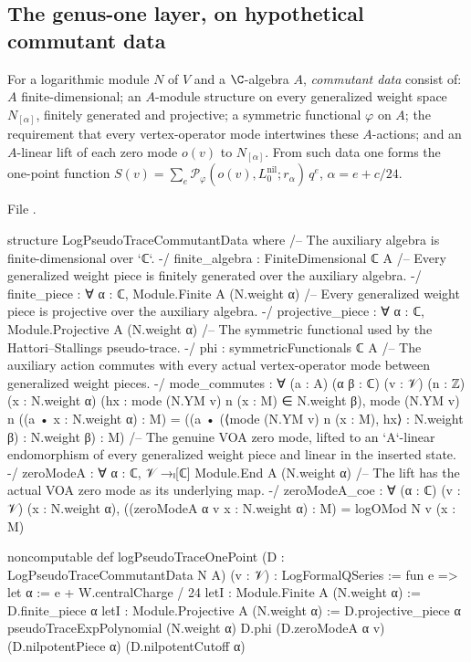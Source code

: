 \subsection{The genus-one layer, on hypothetical commutant data}

\begin{definition}\label{l18:def:commutant}
For a logarithmic module $N$ of $V$ and a $\C$-algebra $A$, \emph{commutant data} consist of: $A$
finite-dimensional; an $A$-module structure on every generalized weight space $N_{[\alpha]}$, finitely generated and
projective; a symmetric functional $\varphi$ on $A$; the requirement that every vertex-operator mode intertwines these
$A$-actions; and an $A$-linear lift of each zero mode $o(v)$ to $N_{[\alpha]}$. From such data one forms the
one-point function $S(v)=\sum_e\mathcal P_\varphi(o(v),L_0^{\mathrm{nil}};r_\alpha)\,q^e$, $\alpha=e+c/24$.
\end{definition}
\noindent File .
\begin{leancode}
structure LogPseudoTraceCommutantData where
  /-- The auxiliary algebra is finite-dimensional over `ℂ`. -/
  finite_algebra : FiniteDimensional ℂ A
  /-- Every generalized weight piece is finitely generated over the auxiliary algebra. -/
  finite_piece : ∀ α : ℂ, Module.Finite A (N.weight α)
  /-- Every generalized weight piece is projective over the auxiliary algebra. -/
  projective_piece : ∀ α : ℂ, Module.Projective A (N.weight α)
  /-- The symmetric functional used by the Hattori--Stallings pseudo-trace. -/
  phi : symmetricFunctionals ℂ A
  /-- The auxiliary action commutes with every actual vertex-operator mode between generalized
  weight pieces. -/
  mode_commutes : ∀ (a : A) (α β : ℂ) (v : 𝒱) (n : ℤ) (x : N.weight α)
    (hx : mode (N.YM v) n (x : M) ∈ N.weight β),
    mode (N.YM v) n ((a • x : N.weight α) : M) =
      ((a • (⟨mode (N.YM v) n (x : M), hx⟩ : N.weight β) : N.weight β) : M)
  /-- The genuine VOA zero mode, lifted to an `A`-linear endomorphism of every generalized
  weight piece and linear in the inserted state. -/
  zeroModeA : ∀ α : ℂ, 𝒱 →ₗ[ℂ] Module.End A (N.weight α)
  /-- The lift has the actual VOA zero mode as its underlying map. -/
  zeroModeA_coe : ∀ (α : ℂ) (v : 𝒱) (x : N.weight α),
    ((zeroModeA α v x : N.weight α) : M) = logOMod N v (x : M)
\end{leancode}
\begin{leancode}
noncomputable def logPseudoTraceOnePoint (D : LogPseudoTraceCommutantData N A) (v : 𝒱) :
    LogFormalQSeries :=
  fun e =>
    let α := e + W.centralCharge / 24
    letI : Module.Finite A (N.weight α) := D.finite_piece α
    letI : Module.Projective A (N.weight α) := D.projective_piece α
    pseudoTraceExpPolynomial (N.weight α) D.phi (D.zeroModeA α v)
      (D.nilpotentPiece α) (D.nilpotentCutoff α)
\end{leancode}
